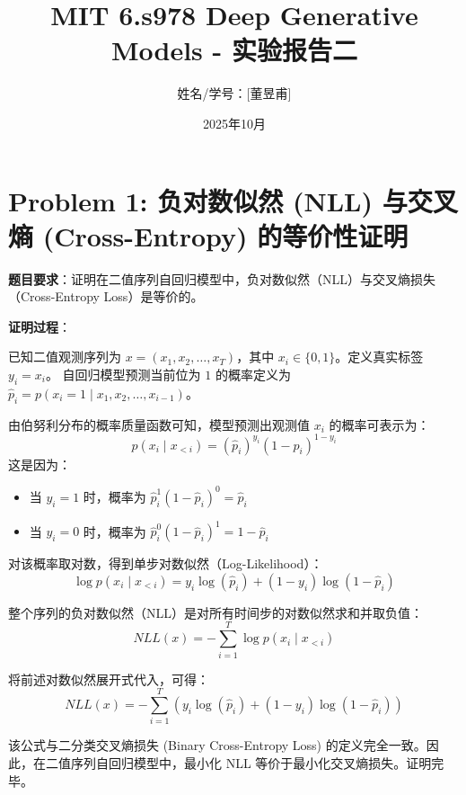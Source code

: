 \documentclass[a4paper, 11pt]{ctexart}
\title{\textbf{MIT 6.s978 Deep Generative Models - 实验报告二}}
\author{姓名/学号：[董昱甫]}
\date{2025年10月}
\begin{document}
\maketitle

\section*{Problem 1: 负对数似然 (NLL) 与交叉熵 (Cross-Entropy) 的等价性证明}

\textbf{题目要求}：证明在二值序列自回归模型中，负对数似然（NLL）与交叉熵损失（Cross-Entropy Loss）是等价的。

\textbf{证明过程}：

已知二值观测序列为 $x = (x_1, x_2, \dots, x_T)$，其中 $x_i \in \{0, 1\}$。定义真实标签 $y_i = x_i$。
自回归模型预测当前位为 $1$ 的概率定义为 $\hat{p}_i = p(x_i=1 \mid x_1, x_2, \dots, x_{i-1})$。

由伯努利分布的概率质量函数可知，模型预测出观测值 $x_i$ 的概率可表示为：
\begin{equation}
p(x_i \mid x_{<i}) = (\hat{p}_i)^{y_i} (1 - \hat{p}_i)^{1 - y_i}
\end{equation}
这是因为：
\begin{itemize}
    \item 当 $y_i = 1$ 时，概率为 $\hat{p}_i^1 (1 - \hat{p}_i)^0 = \hat{p}_i$
    \item 当 $y_i = 0$ 时，概率为 $\hat{p}_i^0 (1 - \hat{p}_i)^1 = 1 - \hat{p}_i$
\end{itemize}

对该概率取对数，得到单步对数似然（Log-Likelihood）：
\begin{equation}
\log p(x_i \mid x_{<i}) = y_i \log(\hat{p}_i) + (1 - y_i) \log(1 - \hat{p}_i)
\end{equation}

整个序列的负对数似然（NLL）是对所有时间步的对数似然求和并取负值：
\begin{equation}
NLL(x) = -\sum_{i=1}^T \log p(x_i \mid x_{<i})
\end{equation}

将前述对数似然展开式代入，可得：
\begin{equation}
NLL(x) = -\sum_{i=1}^T \left( y_i \log(\hat{p}_i) + (1 - y_i) \log(1 - \hat{p}_i) \right)
\end{equation}

该公式与二分类交叉熵损失 (Binary Cross-Entropy Loss) 的定义完全一致。因此，在二值序列自回归模型中，最小化 NLL 等价于最小化交叉熵损失。证明完毕。
\end{document}
